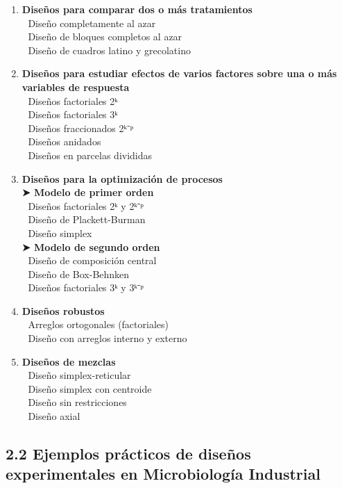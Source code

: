 \documentclass[
  spanish,
  letterpaper,
  DIV=11,
  numbers=noendperiod]{scrreprt}
\begin{document}
\begin{enumerate}
\def\labelenumi{\arabic{enumi}.}
\item
  \textbf{Diseños para comparar dos o más tratamientos}\\
  🔹 Diseño completamente al azar\\
  🔹 Diseño de bloques completos al azar\\
  🔹 Diseño de cuadros latino y grecolatino
\item
  \textbf{Diseños para estudiar efectos de varios factores sobre una o
  más variables de respuesta}\\
  🔹 Diseños factoriales 2ᵏ\\
  🔹 Diseños factoriales 3ᵏ\\
  🔹 Diseños fraccionados 2ᵏ⁻ᵖ\\
  🔹 Diseños anidados\\
  🔹 Diseños en parcelas divididas
\item
  \textbf{Diseños para la optimización de procesos}\\
  \textbf{➤ Modelo de primer orden}\\
  🔹 Diseños factoriales 2ᵏ y 2ᵏ⁻ᵖ\\
  🔹 Diseño de Plackett-Burman\\
  🔹 Diseño simplex\\
  \textbf{➤ Modelo de segundo orden}\\
  🔹 Diseño de composición central\\
  🔹 Diseño de Box-Behnken\\
  🔹 Diseños factoriales 3ᵏ y 3ᵏ⁻ᵖ
\item
  \textbf{Diseños robustos}\\
  🔹 Arreglos ortogonales (factoriales)\\
  🔹 Diseño con arreglos interno y externo
\item
  \textbf{Diseños de mezclas}\\
  🔹 Diseño simplex-reticular\\
  🔹 Diseño simplex con centroide\\
  🔹 Diseño sin restricciones\\
  🔹 Diseño axial
\end{enumerate}

\subsection{2.2 Ejemplos prácticos de diseños experimentales en
Microbiología
Industrial}\label{ejemplos-pruxe1cticos-de-diseuxf1os-experimentales-en-microbiologuxeda-industrial}
\end{document}
